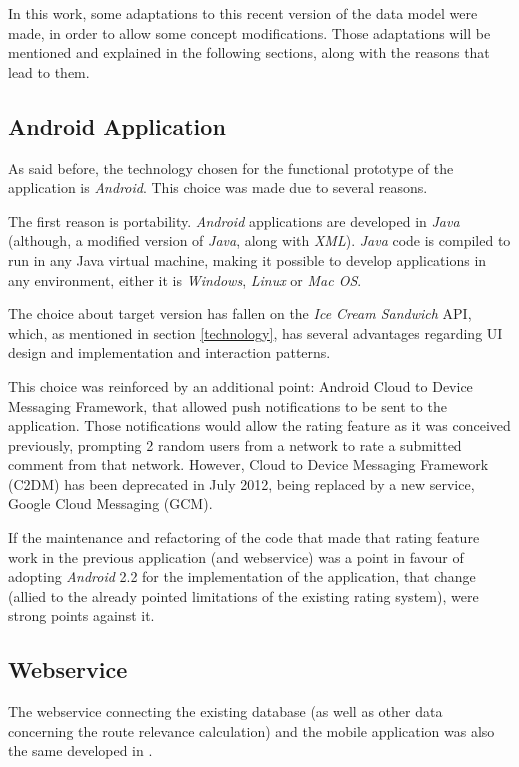 In this work, some adaptations to this recent version of the data model were made, in order to allow some concept modifications. Those adaptations will be mentioned and explained in the following sections, along with the reasons that lead to them.

\subsection{Android Application}

As said before, the technology chosen for the functional prototype of the application is \emph{Android}. This choice was made due to several reasons. 

The first reason is portability. \emph{Android} applications are developed in \emph{Java} (although, a modified version of \emph{Java}, along with \emph{XML}). \emph{Java} code is compiled to run in any Java virtual machine, making it possible to develop applications in any environment, either it is \emph{Windows}, \emph{Linux} or \emph{Mac OS}.

The choice about target version has fallen on the \emph{Ice Cream Sandwich} API, which, as mentioned in section \ref{technology}, has several advantages regarding UI design and implementation and interaction patterns. 

This choice was reinforced by an additional point: Android Cloud to Device Messaging Framework, that allowed push notifications to be sent to the application. Those notifications would allow the rating feature as it was conceived previously, prompting 2 random users from a network to rate a submitted comment from that network. However, Cloud to Device Messaging Framework (C2DM) has been deprecated in July 2012, being replaced by a new service, Google Cloud Messaging (GCM).

If the maintenance and refactoring of the code that made that rating feature work in the previous application (and webservice) was a point in favour of adopting \emph{Android} 2.2 for the implementation of the application, that change (allied to the already pointed limitations of the existing rating system), were strong points against it.

\subsection{Webservice}

The webservice connecting the existing database (as well as other data concerning the route relevance calculation) and the mobile application was also the same developed in \cite{kn:Gon12}.

